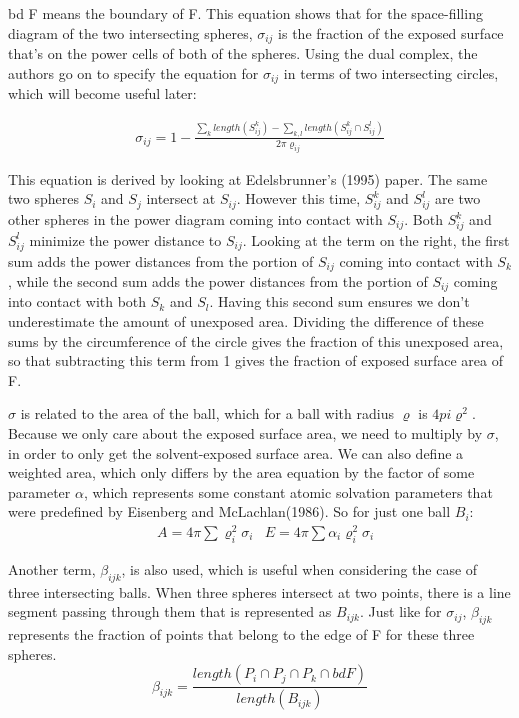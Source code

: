 \documentclass{article}
\begin{document}
bd F means the boundary of F. This equation shows that for the space-filling diagram of the two intersecting spheres, $\sigma_{ij}$ is the fraction of the exposed surface that's on the power cells of both of the spheres.
Using the dual complex, the authors go on to specify the equation for $\sigma_{ij}$ in terms of two intersecting circles, which will become useful later:

\begin{align*}
\sigma_{ij} = 1 - \frac{\sum_k length(S^k_{ij})-\sum_{k,l} length(S^k_{ij}\cap S^l_{ij})}{2\pi\varrho_{ij}}
\end{align*}


This equation is derived by looking at Edelsbrunner's (1995) paper. The same two spheres $S_i$ and $S_j$ intersect at $S_{ij}$. However this time, $S^k_{ij}$ and $S^l_{ij}$ are two other spheres in the power diagram coming into contact with $S_{ij}$. Both  $S^k_{ij}$ and $S^l_{ij}$ minimize the power distance to $S_{ij}$. Looking at the term on the right, the first sum adds the power distances from the portion of $S_{ij}$ coming into contact with $S_k$, while the second sum adds the power distances from the portion of $S_{ij}$ coming into contact with both $S_k$ and $S_l$. Having this second sum ensures we don't underestimate the amount of unexposed area. Dividing the difference of these sums by the circumference of the circle gives the fraction of this unexposed area, so that subtracting this term from 1 gives the fraction of exposed surface area of F.


$\sigma$ is related to the area of the ball, which for a ball with radius $\varrho$ is $4pi\varrho^2$. Because we only care about the exposed surface area, we need to multiply by $\sigma$, in order to only get the solvent-exposed surface area. We can also define a weighted area, which only differs by the area equation by the factor of some parameter $\alpha$, which represents some constant atomic solvation parameters that were predefined by Eisenberg and McLachlan(1986). So for just one ball $B_i$:
\begin{align*}
&A = 4\pi\sum \varrho_i^2\sigma_i
&E = 4\pi\sum\alpha_i\varrho_i^2\sigma_i
\end{align*}

Another term, $\beta_{ijk}$, is also used, which is useful when considering the case of three intersecting balls. When three spheres intersect at two points, there is a line segment passing through them that is represented as $B_{ijk}$. Just like for $\sigma_{ij}$, $\beta_{ijk}$ represents the fraction of points that belong to the edge of F for these three spheres.
\begin{equation*}
\beta_{ijk} = \frac{length(P_i \cap P_j \cap P_k \cap bd F)}{length(B_{ijk})}
\end{equation*}
\end{document}
